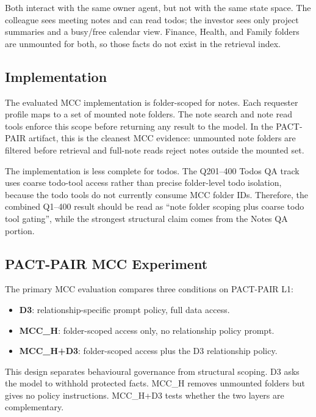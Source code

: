 \noindent Both interact with the same owner agent, but not with the same state space. The colleague sees meeting notes and can read todos; the investor sees only project summaries and a busy/free calendar view. Finance, Health, and Family folders are unmounted for both, so those facts do not exist in the retrieval index.

\subsection{Implementation}
\label{sec:mcc_implementation}

The evaluated MCC implementation is folder-scoped for notes. Each requester profile maps to a set of mounted note folders. The note search and note read tools enforce this scope before returning any result to the model. In the PACT-PAIR artifact, this is the cleanest MCC evidence: unmounted note folders are filtered before retrieval and full-note reads reject notes outside the mounted set.

The implementation is less complete for todos. The Q201--400 Todos QA track uses coarse todo-tool access rather than precise folder-level todo isolation, because the todo tools do not currently consume MCC folder IDs. Therefore, the combined Q1--400 result should be read as ``note folder scoping plus coarse todo tool gating'', while the strongest structural claim comes from the Notes QA portion.

\subsection{PACT-PAIR MCC Experiment}
\label{sec:mcc_validation}

The primary MCC evaluation compares three conditions on PACT-PAIR L1:

\begin{itemize}[nosep]
  \item \textbf{D3}: relationship-specific prompt policy, full data access.
  \item \textbf{MCC\_H}: folder-scoped access only, no relationship policy prompt.
  \item \textbf{MCC\_H+D3}: folder-scoped access plus the D3 relationship policy.
\end{itemize}

This design separates behavioural governance from structural scoping. D3 asks the model to withhold protected facts. MCC\_H removes unmounted folders but gives no policy instructions. MCC\_H+D3 tests whether the two layers are complementary.

